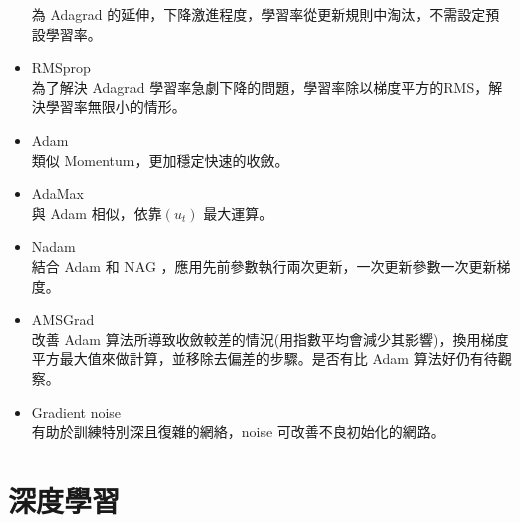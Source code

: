 \documentclass[14pt,a4paper]{report}  %
\begin{document}
\begin{itemize}
為 Adagrad 的延伸，下降激進程度，學習率從更新規則中淘汰，不需設定預設學習率。\\
\item RMSprop\\[6pt]
為了解決 Adagrad 學習率急劇下降的問題，學習率除以梯度平方的RMS，解決學習率無限小的情形。\\
\item Adam\\[6pt]
類似 Momentum，更加穩定快速的收斂。\\
\item AdaMax\\[6pt]
與 Adam 相似，依靠$(u_t)$ 最大運算。\\
\item Nadam\\[6pt]
結合 Adam 和 NAG ，應用先前參數執行兩次更新，一次更新參數一次更新梯度。\\
\item AMSGrad\\[6pt]
改善 Adam 算法所導致收斂較差的情況(用指數平均會減少其影響)，換用梯度平方最大值來做計算，並移除去偏差的步驟。是否有比 Adam 算法好仍有待觀察。\\
\item Gradient noise\\[6pt]
有助於訓練特別深且復雜的網絡，noise 可改善不良初始化的網路。\\
\end{itemize}
\section{深度學習}
\end{document}
